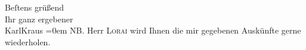 \begin{ledgroupsized}[t]{13cm}
           \pstart
           Beſtens grüßend{\\[\baselineskip]}Ihr ganz ergebener{\\[\baselineskip]}\spacefill\mbox{KarlKraus}\pend
           \leftskip=0em{}\pstart
           \noindent{}\textsc{NB}. Herr \textsc{Lorai} wird Ihnen die mir gegebenen
                        Auskünfte gerne wiederholen.\pend
           \endnumbering{}\end{ledgroupsized}  \newcommand{\dateiname}{L00432}\newcommand{\titel}{Karl Kraus an Arthur Schnitzler, 25. 4. 1895}\newcommand{\editorInnen}{Martin Anton Müller und Gerd-Hermann Susen}
      